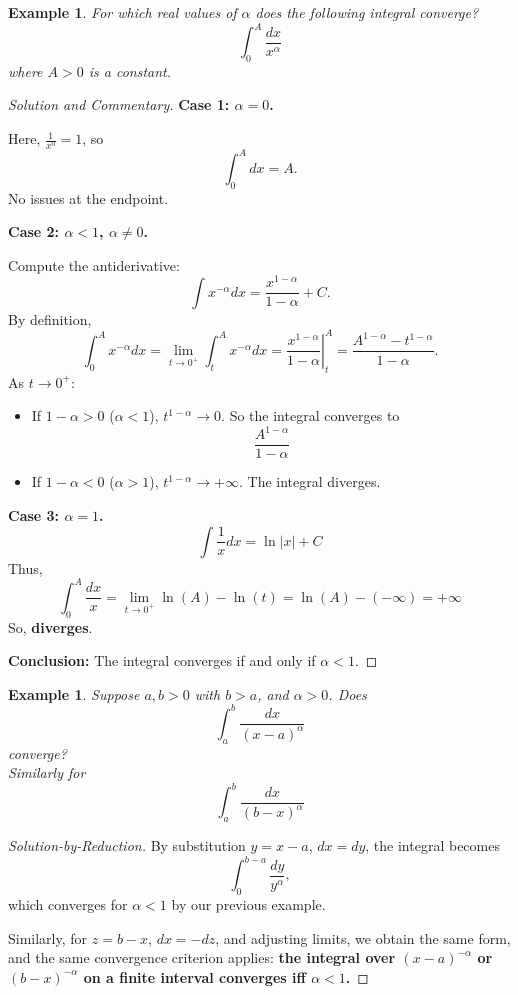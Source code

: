 \documentclass[12pt]{article}
\newtheorem{example}[definition]{Example}
\begin{document}
\begin{example}
For which real values of $\alpha$ does the following integral converge?
\[
\int_0^A \frac{dx}{x^\alpha}
\]
where $A>0$ is a constant.
\end{example}
\begin{proof}[Solution and Commentary]
\textbf{Case 1: $\alpha = 0$.}

Here, $\frac{1}{x^0} = 1$, so
\[
\int_0^A dx = A.
\]
No issues at the endpoint.

\textbf{Case 2: $\alpha<1$, $\alpha\neq 0$.}

Compute the antiderivative:
\[
\int x^{-\alpha} dx = \frac{x^{1-\alpha}}{1-\alpha} + C.
\]
By definition,
\[
\int_0^A x^{-\alpha} dx = \lim_{t\to 0^+} \int_t^A x^{-\alpha}dx = \left.\frac{x^{1-\alpha}}{1-\alpha}\right|_t^A = \frac{A^{1-\alpha} - t^{1-\alpha}}{1-\alpha}.
\]
As $t \to 0^+$:
\begin{itemize}
    \item If $1 - \alpha > 0$ ($\alpha<1$), $t^{1-\alpha} \to 0$. So the integral converges to
    \[
    \frac{A^{1-\alpha}}{1-\alpha}
    \]
    \item If $1 - \alpha < 0$ ($\alpha > 1$), $t^{1-\alpha} \to +\infty$. The integral diverges.
\end{itemize}

\textbf{Case 3: $\alpha = 1$.}
\[
\int \frac{1}{x} dx = \ln|x| + C
\]
Thus,
\[
\int_0^A \frac{dx}{x} = \lim_{t\to 0^+} \ln(A) - \ln(t) = \ln(A) - (-\infty) = +\infty
\]
So, \textbf{diverges}. 

\textbf{Conclusion:} The integral converges if and only if $\alpha < 1$.
\end{proof}

\begin{example}
Suppose $a, b>0$ with $b>a$, and $\alpha>0$. Does
\[
\int_a^b \frac{dx}{(x-a)^\alpha}
\]
converge?\\
Similarly for
\[
\int_a^b \frac{dx}{(b-x)^\alpha}
\]
\end{example}
\begin{proof}[Solution-by-Reduction]
By substitution $y = x-a$, $dx = dy$, the integral becomes
\[
\int_0^{b-a} \frac{dy}{y^\alpha},
\]
which converges for $\alpha < 1$ by our previous example. 

Similarly, for $z = b-x$, $dx = -dz$, and adjusting limits, we obtain the same form, and the same convergence criterion applies: \textbf{the integral over $(x-a)^{-\alpha}$ or $(b-x)^{-\alpha}$ on a finite interval converges iff $\alpha<1$.}
\end{proof}
\end{document}
